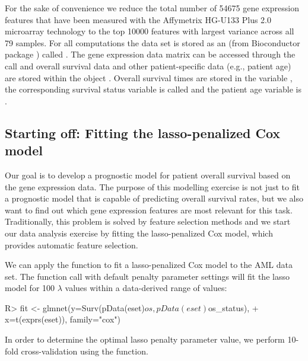 \documentclass[nojss]{jss}
\begin{document}
For the sake of convenience we reduce the total number of 54675 gene expression features that have been measured with the Affymetrix HG-U133 Plus 2.0 microarray technology to the top 10000 features with largest variance across all 79 samples. For all computations the data set is stored as an  (from Bioconductor package  \citep{Bioconductor}) called . The gene expression data matrix can be accessed through the call  and overall survival data and other patient-specific data (e.g., patient age) are stored within the  object . Overall survival times are stored in the variable , the corresponding survival status variable is called  and the patient age variable is .

\subsection{Starting off: Fitting the lasso-penalized Cox model} 
Our goal is to develop a prognostic model for patient overall survival based on the gene expression data. The purpose of this modelling exercise is not just to fit a prognostic model that is capable of predicting overall survival rates, but we also want to find out which gene expression features are most relevant for this task. Traditionally, this problem is solved by feature selection methods and we start our data analysis exercise by fitting the lasso-penalized Cox model, which provides automatic feature selection.

We can apply the  function to fit a lasso-penalized Cox model to the AML data set. The function call with default penalty parameter settings will fit the lasso model for 100 $\lambda$ values within a data-derived range of values:
\begin{Schunk}
\begin{Sinput}
R> fit <- glmnet(y=Surv(pData(eset)$os, pData(eset)$os_status), 
+                x=t(exprs(eset)), family="cox")
\end{Sinput}
\end{Schunk}
 
In order to determine the optimal lasso penalty parameter value, we perform 10-fold cross-validation using the  function.
\end{document}
